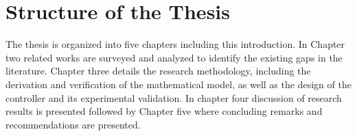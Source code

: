 \section{Structure of the Thesis}

The thesis is organized into five chapters including this introduction. In Chapter two related works are surveyed and analyzed to identify the existing gaps in the literature. Chapter three details the research methodology, including the derivation and verification of the mathematical model, as well as the design of the controller and its experimental validation. In chapter four discussion of research results is presented followed by  Chapter five where concluding remarks and recommendations are presented.




